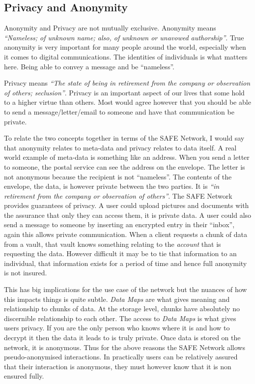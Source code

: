 \subsection{Privacy and Anonymity}

Anonymity and Privacy are not mutually exclusive. Anonymity means \textit{``Nameless; of unknown name; also, of unknown or unavowed authorship''}\cite{anonymous}. True anonymity is very important for many people around the world, especially when it comes to digital communications. The identities of individuals is what matters here. Being able to convey a message and be ``nameless''. 

Privacy means \textit{``The state of being in retirement from the company or observation of others; seclusion''}\cite{privacy}. Privacy is an important aspect of our lives that some hold to a higher virtue than others. Most would agree however that you should be able to send a message/letter/email to someone and have that communication be private.

To relate the two concepts together in terms of the SAFE Network, I would say that anonymity relates to meta-data and privacy relates to data itself. A real world example of meta-data is something like an address. When you send a letter to someone, the postal service can see the address on the envelope. The letter is not anonymous because the recipient is not ``nameless''. The contents of the envelope, the data, is however private between the two parties. It is \textit{``in retirement from the company or observation of others''}. The SAFE Network provides guarantees of privacy. A user could upload pictures and documents with the assurance that only they can access them, it is private data. A user could also send a message to someone by inserting an encrypted entry in their ``inbox'', again this allows private communication. When a client requests a chunk of data from a vault, that vault knows something relating to the \textit{account} that is requesting the data. However difficult it may be to tie that information to an individual, that information exists for a period of time and hence full anonymity is not insured.

This has big implications for the use case of the network but the nuances of how this impacts things is quite subtle. \textit{Data Maps} are what gives meaning and relationship to chunks of data. At the storage level, chunks have absolutely no discernible relationship to each other. The access to \textit{Data Maps} is what gives users privacy. If you are the only person who knows where it is and how to decrypt it then the data it leads to is truly private. Once data is stored on the network, it is anonymous. Thus for the above reasons the SAFE Network allows pseudo-anonymised interactions. In practically users can be relatively assured that their interaction is anonymous, they must however know that it is non ensured fully.

